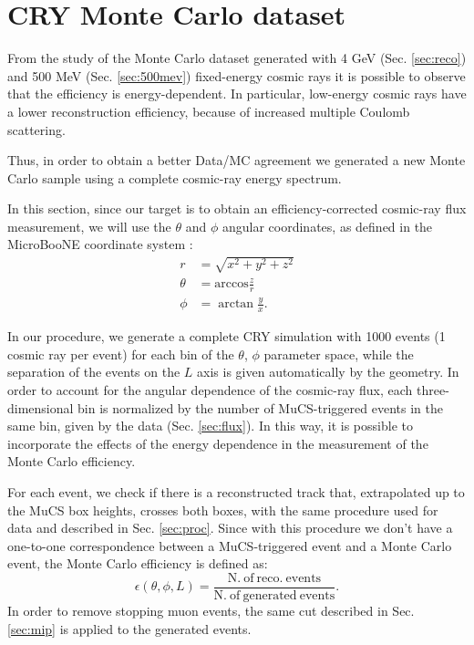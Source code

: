 \documentclass[a4paper]{scrartcl}
\begin{document}
\section{CRY Monte Carlo dataset}\label{sec:cry}
From the study of the Monte Carlo dataset generated with 4 GeV (Sec. \ref{sec:reco}) and 500 MeV (Sec. \ref{sec:500mev}) fixed-energy cosmic rays it is possible to observe that the efficiency is energy-dependent. In particular, low-energy cosmic rays have a lower reconstruction efficiency, because of increased multiple Coulomb scattering.

Thus, in order to obtain a better Data/MC agreement we generated a new Monte Carlo sample using a complete cosmic-ray energy spectrum.

In this section, since our target is to obtain an efficiency-corrected cosmic-ray flux measurement, we will use the $\theta$ and $\phi$ angular coordinates, as defined in the MicroBooNE coordinate system \cite{datamc}:
\begin{equation}
  \begin{aligned}
    r &= \sqrt{x^2+y^2+z^2}\\
    \theta &= \mathrm{arccos}\frac{z}{r}\\
    \phi &= \arctan \frac{y}{x}.
  \end{aligned}
\end{equation}

In our procedure, we generate a complete CRY simulation with 1000 events (1 cosmic ray per event) for each bin of the $\theta$, $\phi$ parameter space, while the separation of the events on the $L$ axis is given automatically by the geometry. In order to account for the angular dependence of the cosmic-ray flux, each three-dimensional bin is normalized by the number of MuCS-triggered events in the same bin, given by the data (Sec. \ref{sec:flux}). In this way, it is possible to incorporate the effects of the energy dependence in the measurement of the Monte Carlo efficiency.

For each event, we check if there is a reconstructed track that, extrapolated up to the MuCS box heights, crosses both boxes, with the same procedure used for data and described in Sec. \ref{sec:proc}.
Since with this procedure we don't have a one-to-one correspondence between a MuCS-triggered event and a Monte Carlo event, the Monte Carlo efficiency is defined as:
\begin{equation}
  \epsilon(\theta,\phi,L) = \frac{\mathrm{N.~of~reco.~events}}{\mathrm{N.~of~generated~events}}.
\end{equation}
In order to remove stopping muon events, the same cut described in Sec. \ref{sec:mip} is applied to the generated events.
\end{document}

